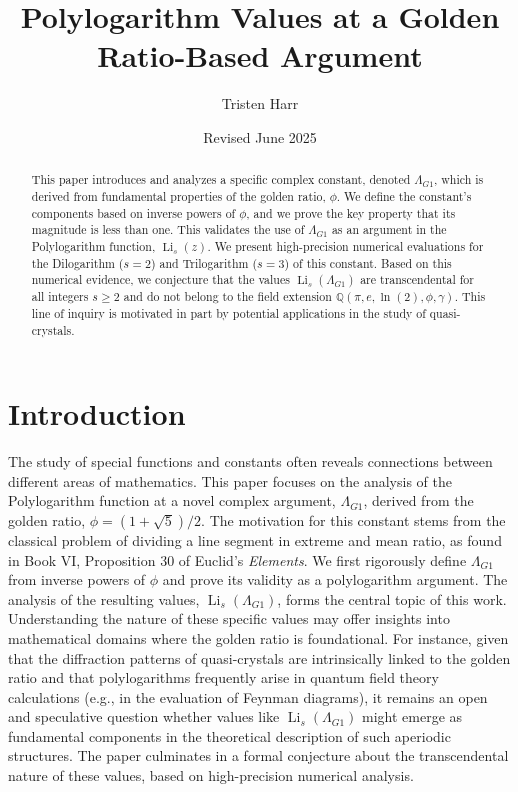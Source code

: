 \documentclass{amsart}
\theoremstyle{plain}
\theoremstyle{definition}
\theoremstyle{remark}
\DeclareMathOperator{\Li}{Li} %
\newcommand{\LambdaG}{\Lambda_{G1}}
\newcommand{\phiG}{\phi}
\begin{document}
\title[Polylogarithms at a Golden Ratio Argument]{Polylogarithm Values at a Golden Ratio-Based Argument}
\author{Tristen Harr}
\date{Revised June 2025}

\begin{abstract}
This paper introduces and analyzes a specific complex constant, denoted $\LambdaG$, which is derived from fundamental properties of the golden ratio, $\phiG$. We define the constant's components based on inverse powers of $\phiG$, and we prove the key property that its magnitude is less than one. This validates the use of $\LambdaG$ as an argument in the Polylogarithm function, $\Li_s(z)$. We present high-precision numerical evaluations for the Dilogarithm ($s=2$) and Trilogarithm ($s=3$) of this constant. Based on this numerical evidence, we conjecture that the values $\Li_s(\LambdaG)$ are transcendental for all integers $s \ge 2$ and do not belong to the field extension $\mathbb{Q}(\pi, e, \ln(2), \phiG, \gamma)$. This line of inquiry is motivated in part by potential applications in the study of quasi-crystals.
\end{abstract}

\maketitle

\section{Introduction}
The study of special functions and constants often reveals connections between different areas of mathematics. This paper focuses on the analysis of the Polylogarithm function at a novel complex argument, $\LambdaG$, derived from the golden ratio, $\phiG = (1+\sqrt{5})/2$. The motivation for this constant stems from the classical problem of dividing a line segment in extreme and mean ratio, as found in Book VI, Proposition 30 of Euclid's \textit{Elements}. We first rigorously define $\LambdaG$ from inverse powers of $\phiG$ and prove its validity as a polylogarithm argument. The analysis of the resulting values, $\Li_s(\LambdaG)$, forms the central topic of this work. Understanding the nature of these specific values may offer insights into mathematical domains where the golden ratio is foundational. For instance, given that the diffraction patterns of quasi-crystals are intrinsically linked to the golden ratio and that polylogarithms frequently arise in quantum field theory calculations (e.g., in the evaluation of Feynman diagrams), it remains an open and speculative question whether values like $\Li_s(\LambdaG)$ might emerge as fundamental components in the theoretical description of such aperiodic structures. The paper culminates in a formal conjecture about the transcendental nature of these values, based on high-precision numerical analysis.
\end{document}

